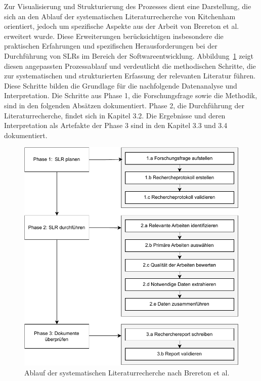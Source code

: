 Zur Visualisierung und Strukturierung des Prozesses dient eine Darstellung, die sich an den Ablauf der systematischen 
Literaturrecherche von Kitchenham orientiert, jedoch um spezifische Aspekte aus der Arbeit von 
Brereton et al.~\cite{brereton2007lessons} erweitert wurde. Diese Erweiterungen berücksichtigen insbesondere die 
praktischen Erfahrungen und spezifischen Herausforderungen bei der Durchführung von SLRs im Bereich der Softwareentwicklung. 
Abbildung~\ref{fig:slr_kitchenham} zeigt diesen angepassten Prozessablauf und verdeutlicht die methodischen Schritte, die 
zur systematischen und strukturierten Erfassung der relevanten Literatur führen. Diese Schritte bilden die Grundlage für 
die nachfolgende Datenanalyse und Interpretation. Die Schritte aus Phase 1, die Forschungsfrage sowie die Methodik, sind 
in den folgenden Absätzen dokumentiert. Phase 2, die Durchführung der Literaturrecherche, findet sich in Kapitel 3.2. 
Die Ergebnisse und deren Interpretation als Artefakte der Phase 3 sind in den Kapitel 3.3 und 3.4 dokumentiert. 

\begin{figure}[h!]
    \centering
    \includegraphics[width=1\textwidth]{graphics/slr_kitchenham_ablauf_new.pdf}
    \caption{Ablauf der systematischen Literaturrecherche nach Brereton et al.~\cite{brereton2007lessons}}
\label{fig:slr_kitchenham}
\end{figure}

